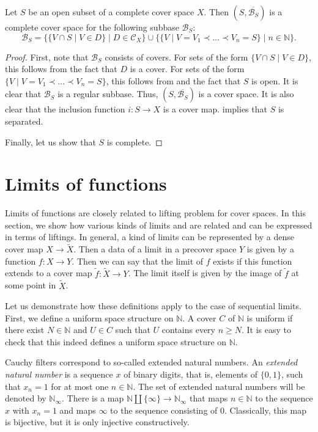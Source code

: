 \documentclass[reqno]{amsart}
\theoremstyle{definition}
\theoremstyle{remark}
\numberwithin{figure}{section}
\newcommand{\rb}{\prec}
\begin{document}
\begin{prop}
Let $S$ be an open subset of a complete cover space $X$.
Then $(S,\overline{\mathcal{B}_S})$ is a complete cover space for the following subbase $\mathcal{B}_S$:
\[ \mathcal{B}_S = \{ \{ V \cap S \mid V \in D \} \mid D \in \mathcal{C}_X \} \cup \{ \{ V \mid V = V_1 \rb \ldots \rb V_n = S \} \mid n \in \mathbb{N} \}. \]
\end{prop}
\begin{proof}
First, note that $\mathcal{B}_S$ consists of covers.
For sets of the form $\{ V \cap S \mid V \in D \}$, this follows from the fact that $D$ is a cover.
For sets of the form $\{ V \mid V = V_1 \rb \ldots \rb V_n = S \}$, this follows from  and the fact that $S$ is open.
It is clear that $\mathcal{B}_S$ is a regular subbase.
Thus, $(S,\overline{\mathcal{B}_S})$ is a cover space.
It is also clear that the inclusion function $i : S \to X$ is a cover map.
 implies that $S$ is separated.

Finally, let us show that $S$ is complete.
\end{proof}

\section{Limits of functions}

Limits of functions are closely related to lifting problem for cover spaces.
In this section, we show how various kinds of limits and are related and can be expressed in terms of liftings.
In general, a kind of limits can be represented by a dense cover map $X \to \widetilde{X}$.
Then a data of a limit in a precover space $Y$ is given by a function $f : X \to Y$.
Then we can say that the limit of $f$ exists if this function extends to a cover map $\widetilde{f} : \widetilde{X} \to Y$.
The limit itself is given by the image of $\widetilde{f}$ at some point in $\widetilde{X}$.

Let us demonstrate how these definitions apply to the case of sequential limits.
First, we define a uniform space structure on $\mathbb{N}$.
A cover $C$ of $\mathbb{N}$ is uniform if there exist $N \in \mathbb{N}$ and $U \in C$ such that $U$ contains every $n \geq N$.
It is easy to check that this indeed defines a uniform space structure on $\mathbb{N}$.

Cauchy filters correspond to so-called extended natural numbers.
An \emph{extended natural number} is a sequence $x$ of binary digits, that is, elements of $\{ 0, 1 \}$, such that $x_n = 1$ for at most one $n \in \mathbb{N}$.
The set of extended natural numbers will be denoted by $\mathbb{N}_\infty$.
There is a map $\mathbb{N} \amalg \{ \infty \} \to \mathbb{N}_\infty$ that maps $n \in \mathbb{N}$ to the sequence $x$ with $x_n = 1$ and maps $\infty$ to the sequence consisting of $0$.
Classically, this map is bijective, but it is only injective constructively.
\end{document}
